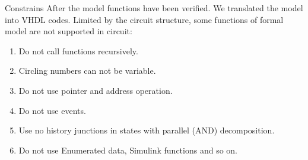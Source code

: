 \documentclass[12pt,beamer]{beamer}
\begin{document}
%
%
%
%
%

%	
%
%


\begin{frame}{Constrains}
	After the model functions have been verified. We translated the model into VHDL codes. Limited by the circuit structure,
	some functions of formal model are not supported in circuit:
	\vspace{10pt}
	\begin{enumerate}
		\item Do not call functions recursively.
		\item Circling numbers can not be variable.
		\item Do not use pointer and address operation.
		\item Do not use events.
		\item Use no history junctions in states with parallel (AND) decomposition.
		\item Do not use Enumerated data, Simulink functions and so on.
	\end{enumerate}
\end{frame}
\end{document}
